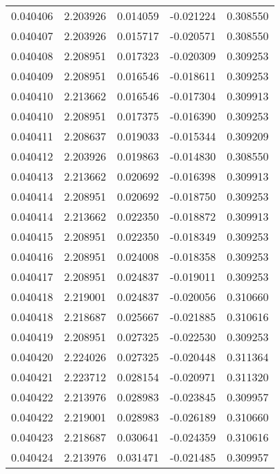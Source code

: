 \begin{tabular}{lrrrr}
0.040406    &  2.203926 &  0.014059 & -0.021224 &             0.308550 \\
0.040407    &  2.203926 &  0.015717 & -0.020571 &             0.308550 \\
0.040408    &  2.208951 &  0.017323 & -0.020309 &             0.309253 \\
0.040409    &  2.208951 &  0.016546 & -0.018611 &             0.309253 \\
0.040410    &  2.213662 &  0.016546 & -0.017304 &             0.309913 \\
0.040410    &  2.208951 &  0.017375 & -0.016390 &             0.309253 \\
0.040411    &  2.208637 &  0.019033 & -0.015344 &             0.309209 \\
0.040412    &  2.203926 &  0.019863 & -0.014830 &             0.308550 \\
0.040413    &  2.213662 &  0.020692 & -0.016398 &             0.309913 \\
0.040414    &  2.208951 &  0.020692 & -0.018750 &             0.309253 \\
0.040414    &  2.213662 &  0.022350 & -0.018872 &             0.309913 \\
0.040415    &  2.208951 &  0.022350 & -0.018349 &             0.309253 \\
0.040416    &  2.208951 &  0.024008 & -0.018358 &             0.309253 \\
0.040417    &  2.208951 &  0.024837 & -0.019011 &             0.309253 \\
0.040418    &  2.219001 &  0.024837 & -0.020056 &             0.310660 \\
0.040418    &  2.218687 &  0.025667 & -0.021885 &             0.310616 \\
0.040419    &  2.208951 &  0.027325 & -0.022530 &             0.309253 \\
0.040420    &  2.224026 &  0.027325 & -0.020448 &             0.311364 \\
0.040421    &  2.223712 &  0.028154 & -0.020971 &             0.311320 \\
0.040422    &  2.213976 &  0.028983 & -0.023845 &             0.309957 \\
0.040422    &  2.219001 &  0.028983 & -0.026189 &             0.310660 \\
0.040423    &  2.218687 &  0.030641 & -0.024359 &             0.310616 \\
0.040424    &  2.213976 &  0.031471 & -0.021485 &             0.309957 \\

\end{tabular}
